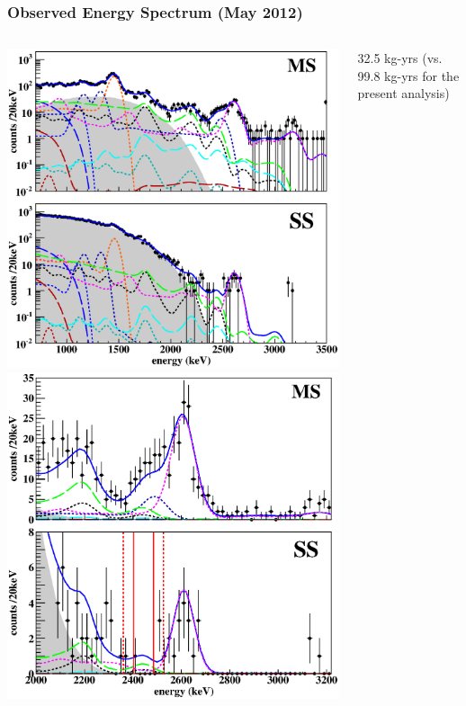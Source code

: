 \documentclass{beamer}
\begin{document}
\begin{frame}
\begin{center}
\frametitle{Observed Energy Spectrum (May 2012)}
\end{center}
\vspace{0.4cm}%
\begin{columns}
\begin{column}{.8\textwidth}
\includegraphics[keepaspectratio=true,width=\textwidth,clip=true,trim=0mm 5mm 0mm 96mm]{OldSSSpectrum.eps}\\
\includegraphics[keepaspectratio=true,width=\textwidth,clip=true,trim=0mm 5mm 0mm 96mm]{OldSSSpectrum_zoom.eps}
\end{column}
\begin{column}{0.2\textwidth}
32.5 kg-yrs (vs. 99.8 kg-yrs for the present analysis)
\end{column}
\end{columns}
\end{frame}
\end{document}
